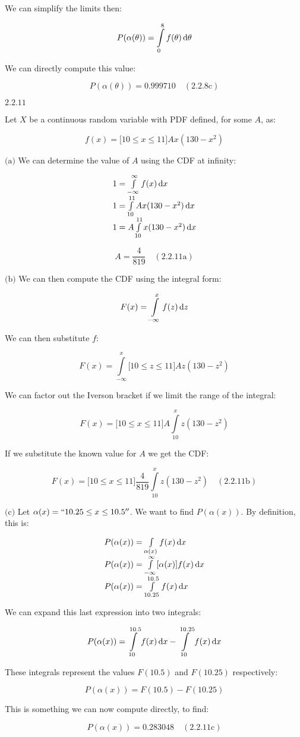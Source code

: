 \documentclass{article}
\newcommand{\problem}[2]{$\boxed{\text{#1.#2}}$}
\newcommand{\subproblem}[3]{$\boxed{\text{(#3)}}$}
\newcommand{\solution}[3]{\boxed{#3\quad(\text{#1.#2})}}
\newcommand{\subsolution}[4]{\boxed{#4\quad(\text{#1.#2#3})}}
\renewcommand{\d}[1]{\,\textnormal{d}#1}
\begin{document}
We can simplify the limits then:

\[
P(\alpha(\theta))=\int\limits_{0}^{8} f(\theta)\d{\theta}
\]

We can directly compute this value:

\[
\solution{2.2}{8c}{P(\alpha(\theta))=0.999710}
\]

%
\problem{2.2}{11}

Let $X$ be a continuous random variable with PDF defined, for some
$A$, as:

\[
f(x)=\lbrack10\le x\le11\rbrack Ax(130-x^2)
\]

\subproblem{2.2}{11}{a} We can determine the value of $A$ using the
CDF at infinity:

\[
\begin{array}{l}
1=\int\limits_{-\infty}^\infty f(x)\d{x} \\
1=\int\limits_{10}^{11} Ax(130-x^2)\d{x} \\
1=A\int\limits_{10}^{11} x(130-x^2)\d{x}
\end{array}
\]

\[
\subsolution{2.2}{11}{a}{A=\dfrac{4}{819}}
\]

\subproblem{2.2}{11}{b} We can then compute the CDF using the integral
form:

\[
F(x)=\int\limits_{-\infty}^x f(z)\d{z}
\]

We can then substitute $f$:

\[
F(x)=\int\limits_{-\infty}^x \lbrack10\le z\le11\rbrack Az(130-z^2)
\]

We can factor out the Iverson bracket if we limit the range of the
integral:

\[
F(x)=\lbrack10\le x\le11\rbrack A\int\limits_{10}^x z(130-z^2)
\]

If we substitute the known value for $A$ we get the CDF:

\[
\subsolution{2.2}{11}{b}{F(x)=\lbrack10\le x\le11\rbrack \frac{4}{819}\int\limits_{10}^x z(130-z^2)}
\]

\subproblem{2.2}{11}{c} Let $\alpha(x)=``10.25\le{}x\le10.5''$. We
want to find $P(\alpha(x))$. By definition, this is:

\[
\begin{array}{l}
P(\alpha(x))=\int\limits_{\alpha(x)}f(x)\d{x} \\
P(\alpha(x))=\int\limits_{-\infty}^\infty \lbrack\alpha(x)\rbrack f(x)\d{x} \\
P(\alpha(x))=\int\limits_{10.25}^{10.5} f(x)\d{x} \\
\end{array}
\]

We can expand this last expression into two integrals:

\[
P(\alpha(x))=\int\limits_{10}^{10.5} f(x)\d{x}-\int\limits_{10}^{10.25} f(x)\d{x}
\]

These integrals represent the values $F(10.5)$ and $F(10.25)$
respectively:

\[
P(\alpha(x))=F(10.5)-F(10.25)
\]

This is something we can now compute directly, to find:

\[
\subsolution{2.2}{11}{c}{P(\alpha(x))=0.283048}
\]
\end{document}
